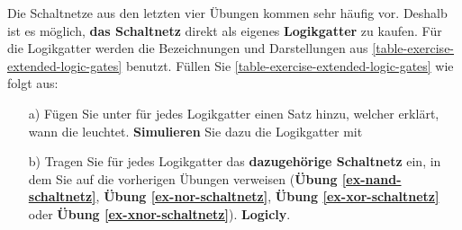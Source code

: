 \begin{exercise}\label{exercise-xor-nor-nand-xnor}
Die Schaltnetze aus den letzten vier Übungen kommen sehr häufig vor. Deshalb ist es möglich, \textbf{das Schaltnetz} direkt als eigenes \textbf{Logikgatter} zu kaufen. Für die Logikgatter werden die Bezeichnungen und Darstellungen aus \autoref{table-exercise-extended-logic-gates} benutzt. Füllen Sie \autoref{table-exercise-extended-logic-gates} wie folgt aus:

\begin{enumerate}
\item[a)] Fügen Sie unter  für jedes Logikgatter einen Satz hinzu, welcher erklärt, wann die  leuchtet. \textbf{Simulieren} Sie dazu die Logikgatter mit 
\item[b)] Tragen Sie für jedes Logikgatter das \textbf{dazugehörige Schaltnetz} ein, in dem Sie auf die vorherigen Übungen verweisen (\textbf{Übung \ref{ex-nand-schaltnetz}}, \textbf{Übung \ref{ex-nor-schaltnetz}}, \textbf{Übung \ref{ex-xor-schaltnetz}} oder \textbf{Übung \ref{ex-xnor-schaltnetz}}).
\textbf{Logicly}.
\end{enumerate}


\end{exercise}
